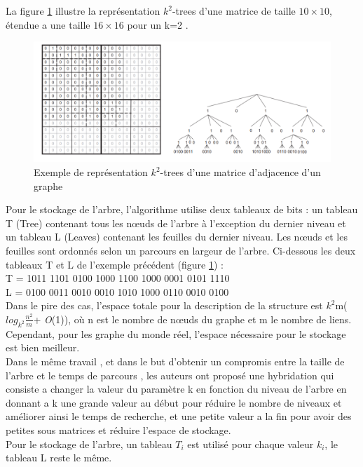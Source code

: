 La figure \ref{k2-trees-exemples} illustre la représentation $k^2$-trees d'une matrice de taille $10 \times 10$, étendue a une  taille $16 \times 16$ pour un k=2 \citep{brisaboa2015efficient}.

\begin{figure}[H]
\begin{center}
\includegraphics[height=200 pt, width=450 pt]{./ressources/image/k2-trees.png} 
\end{center}
\caption{Exemple de représentation $k^2$-trees d'une matrice d'adjacence d'un graphe}
\label{k2-trees-exemples}
\end{figure}


Pour le stockage de l'arbre, l'algorithme utilise deux tableaux de bits : un tableau T (Tree) contenant tous les nœuds de l'arbre à l'exception du dernier niveau et un tableau L (Leaves) contenant les feuilles du dernier niveau. Les nœuds et les feuilles sont ordonnés selon un parcours en largeur de l'arbre.   
Ci-dessous les deux tableaux T et L de l'exemple précédent (figure \ref{k2-trees-exemples}) : \\
T = 1011 1101 0100 1000 1100 1000 0001 0101 1110\\
L = 0100 0011 0010 0010 1010 1000 0110 0010 0100\\
Dans le pire des cas, l'espace totale pour la description de la structure est $k^2$m($log_{k^2}\frac{n^2}{m}$+ \textit{O}(1)), où n est le nombre de nœuds du graphe et m le nombre de liens. Cependant, pour les graphe du monde réel, l'espace nécessaire pour le stockage est bien meilleur. \\

Dans le même travail \citep{brisaboa2009k}, et dans le but d'obtenir un compromis entre la taille de l'arbre et le temps de parcours , les auteurs ont proposé une hybridation qui consiste a changer la valeur du paramètre k en fonction du niveau de l'arbre en donnant a k une grande valeur au début pour réduire le nombre de niveaux et améliorer ainsi le temps de recherche, et une petite valeur a la fin pour avoir des petites sous matrices et réduire l'espace de stockage.\\
Pour le stockage de l'arbre, un tableau $T_{i}$ est utilisé pour chaque valeur $k_{i}$, le tableau L reste le même.\\

